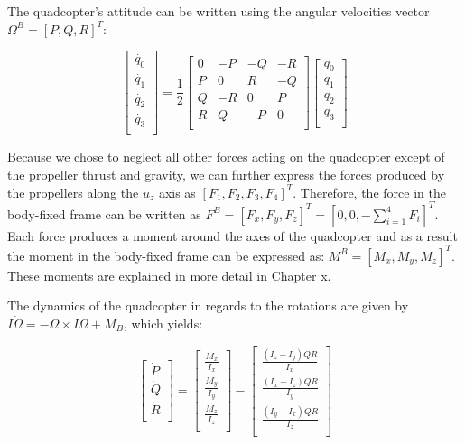 The quadcopter's attitude can be written using the angular velocities vector $\Omega^{B}=[P, Q, R]^{T}$:

  \begin{equation}
\label{S7}
 \begin{bmatrix}
 	\dot{q_{0}} \\
 	\dot{q_{1}}\\
 	\dot{q_{2}} \\
 	\dot{q_{3}} \\
 	\end{bmatrix}=\frac{1}{2}\begin{bmatrix}
 	0 & -P & -Q & -R \\
 	P & 0 & R & -Q \\
 	Q & -R & 0 & P \\
 	R & Q & -P & 0 \\
 	\end{bmatrix}\begin{bmatrix}
 	q_{0} \\
 	q_{1}\\
 	q_{2} \\
 	q_{3} \\
 	\end{bmatrix}
 	 \end{equation}

Because we chose to neglect all other forces acting on the quadcopter except of the propeller thrust and gravity, we can further express the forces produced by the propellers along the $u_{z}$ axis as $[F_{1}, F_{2}, F_{3}, F_{4}]^{T}$. Therefore, the force in the body-fixed frame can be written as $F^{B}=[F_{x}, F_{y}, F_{z}]^{T}=[0, 0, -\sum\limits_{i=1}^4 F_{i}]^{T}$. Each force produces a moment around the axes of the quadcopter and as a result the moment in the body-fixed frame can be expressed as: $M^{B}=[M_{x}, M_{y}, M_{z}]^{T}$. These moments are explained in more detail in Chapter x.

The dynamics of the quadcopter in regards to the rotations are given by $I\dot{\Omega}=-\Omega\times I \Omega+M_{B}$, which yields:

\begin{equation}
\label{S8}
 \begin{bmatrix}
 	\dot{P} \\
 	\dot{Q} \\
 	\dot{R} \\
 	\end{bmatrix}=\begin{bmatrix}
 	\frac{M_{x}}{I_{x}}  \\
 	\frac{M_{y}}{I_{y}}  \\
 	\frac{M_{z}}{I_{z}}  \\
 	\end{bmatrix}-\begin{bmatrix}
 	\frac{(I_{z}-I_{y})QR}{I_{x}} \\
 	\frac{(I_{x}-I_{z})QR}{I_{y}} \\
 	\frac{(I_{y}-I_{x})QR}{I_{z}} \\
 	\end{bmatrix}
 	 \end{equation}
 	 
